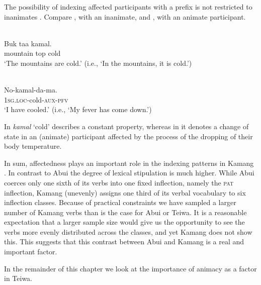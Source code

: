   The possibility of indexing affected participants with a prefix is not restricted to inanimates . Compare , with an inanimate, and , with an animate participant.


\ea%
\label{bkm:Ref384657017}
 \\ 
\gll   Buk  taa  kamal.   \\  
    mountain  top  cold    \\
\glt `The mountains are cold.' (i.e., `In the mountains, it is cold.')
\z



\ea%
\label{bkm:Ref384657025}
 \\ 
\gll    No-kamal-da-ma.     \\  
    1\textsc{sg}.\textsc{loc}{}-cold-\textsc{aux-pfv}   \\
\glt  `I have cooled.' (i.e., `My fever has come down.')
\z



In  \textit{kamal} `cold' describes a constant property, whereas in  it denotes a change of state in an (animate) participant affected by the process of the dropping of their body temperature.

In sum, affectedness plays an important role in the indexing patterns in Kamang . In contrast to Abui  the degree of lexical stipulation  is much higher. While Abui coerces only one sixth of its verbs into one fixed inflection, namely the \textsc{pat} inflection, Kamang  (unevenly) assigns one third of its verbal vocabulary to six inflection classes. Because of practical constraints we have sampled a larger number of Kamang  verbs than is the case for Abui or Teiwa. It is a reasonable expectation that a larger sample size would give us the opportunity to see the verbs more evenly distributed across the classes, and yet Kamang  does not show this. This suggests that this contrast between Abui and Kamang  is a real and important factor.

In the remainder of this chapter we look at the importance of animacy as a factor in Teiwa.

